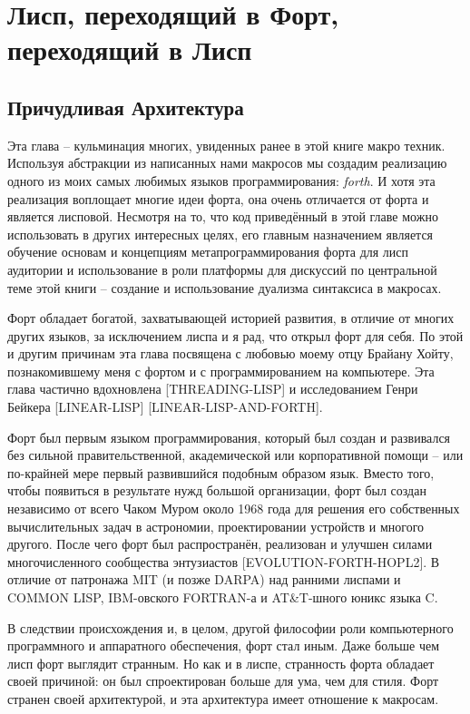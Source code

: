 \chapter[Лисп в Форт, Форт в Лисп]{Лисп, переходящий в Форт, переходящий в Лисп}\label{chapter_lisp_forth_lisp}

\section{Причудливая Архитектура}\label{section_wird_design} 

Эта глава -- кульминация многих, увиденных ранее в этой книге макро техник. Используя абстракции из написанных нами макросов мы создадим реализацию одного из моих самых любимых языков программирования: \emph{forth}. И хотя эта реализация воплощает многие идеи форта, она очень отличается от форта и является лисповой. Несмотря на то, что код приведённый в этой главе можно использовать в других интересных целях, его главным назначением является обучение основам и концепциям метапрограммирования форта для лисп аудитории и использование в роли платформы для дискуссий по центральной теме этой книги -- создание и использование дуализма синтаксиса в макросах.

Форт обладает богатой, захватывающей историей развития, в отличие от многих других языков, за исключением лиспа и я рад, что открыл форт для себя. По этой и другим причинам эта глава посвящена с любовью моему отцу Брайану Хойту, познакомившему меня с фортом и с программированием на компьютере. Эта глава частично вдохновлена [THREADING-LISP] и исследованием Генри Бейкера [LINEAR-LISP] [LINEAR-LISP-AND-FORTH].

Форт был первым языком программирования, который был создан и развивался без сильной правительственной, академической или корпоративной помощи -- или по-крайней мере первый развившийся подобным образом язык. Вместо того, чтобы появиться в результате нужд большой организации, форт был создан независимо от всего Чаком Муром около 1968 года для решения его собственных вычислительных задач в астрономии, проектировании устройств и многого другого. После чего форт был распространён, реализован и улучшен силами многочисленного сообщества энтузиастов [EVOLUTION-FORTH-HOPL2]. В отличие от патронажа MIT (и позже DARPA) над ранними лиспами и COMMON LISP, IBM-овского FORTRAN-а и AT\&T-шного юникс языка C.

В следствии происхождения и, в целом, другой философии роли компьютерного программного и аппаратного обеспечения, форт стал иным. Даже больше чем лисп форт выглядит странным. Но как и в лиспе, странность форта обладает своей причиной: он был спроектирован больше для ума, чем для стиля. Форт странен своей архитектурой, и эта архитектура имеет отношение к макросам.

